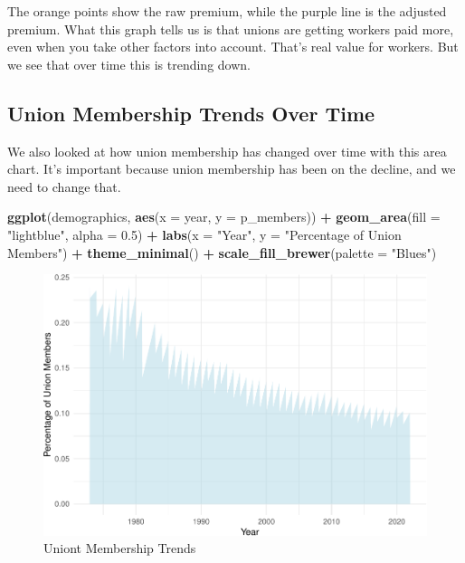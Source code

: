 \documentclass[
]{book}
\newenvironment{Shaded}{\begin{snugshade}}{\end{snugshade}}
\newcommand{\AttributeTok}[1]{\textcolor[rgb]{0.13,0.29,0.53}{#1}}
\newcommand{\FloatTok}[1]{\textcolor[rgb]{0.00,0.00,0.81}{#1}}
\newcommand{\FunctionTok}[1]{\textcolor[rgb]{0.13,0.29,0.53}{\textbf{#1}}}
\newcommand{\NormalTok}[1]{#1}
\newcommand{\SpecialCharTok}[1]{\textcolor[rgb]{0.81,0.36,0.00}{\textbf{#1}}}
\newcommand{\StringTok}[1]{\textcolor[rgb]{0.31,0.60,0.02}{#1}}
\theoremstyle{definition}
\theoremstyle{definition}
\theoremstyle{definition}
\theoremstyle{definition}
\theoremstyle{remark}
\begin{document}
The orange points show the raw premium, while the purple line is the adjusted premium. What this graph tells us is that unions are getting workers paid more, even when you take other factors into account. That's real value for workers. But we see that over time this is trending down.

\subsection{Union Membership Trends Over Time}\label{union-membership-trends-over-time}

We also looked at how union membership has changed over time with this area chart. It's important because union membership has been on the decline, and we need to change that.

\begin{Shaded}
\begin{Highlighting}[]
\FunctionTok{ggplot}\NormalTok{(demographics, }\FunctionTok{aes}\NormalTok{(}\AttributeTok{x =}\NormalTok{ year, }\AttributeTok{y =}\NormalTok{ p\_members)) }\SpecialCharTok{+}
  \FunctionTok{geom\_area}\NormalTok{(}\AttributeTok{fill =} \StringTok{"lightblue"}\NormalTok{, }\AttributeTok{alpha =} \FloatTok{0.5}\NormalTok{) }\SpecialCharTok{+}
  \FunctionTok{labs}\NormalTok{(}\AttributeTok{x =} \StringTok{"Year"}\NormalTok{, }\AttributeTok{y =} \StringTok{"Percentage of Union Members"}\NormalTok{) }\SpecialCharTok{+}
  \FunctionTok{theme\_minimal}\NormalTok{() }\SpecialCharTok{+}
  \FunctionTok{scale\_fill\_brewer}\NormalTok{(}\AttributeTok{palette =} \StringTok{"Blues"}\NormalTok{)}
\end{Highlighting}
\end{Shaded}

\begin{figure}
\centering
\includegraphics{_main_files/figure-latex/membertime-1.pdf}
\caption{\label{fig:membertime}Uniont Membership Trends}
\end{figure}
\end{document}
